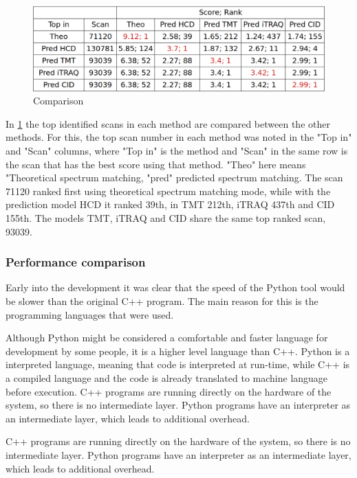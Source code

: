 \documentclass[11pt]{article}
\begin{document}
\begin{figure}[ht]
\centering
\includegraphics[width=1\textwidth]{figs/ident-comparison.png}
\caption{Comparison}
\label{fig:ident-comparison}
\end{figure}

In \cref{fig:ident-comparison} the top identified scans in each method are compared between the other methods. For this, the top scan number in each method was noted in the "Top in" and "Scan" columns, where "Top in" is the method and "Scan" in the same row is the scan that has the best score using that method. "Theo" here means "Theoretical spectrum matching, "pred" predicted spectrum matching. 
The scan 71120 ranked first using theoretical spectrum matching mode, while with the prediction model HCD it ranked 39th, in TMT 212th, iTRAQ 437th and CID 155th. The models TMT, iTRAQ and CID share the same top ranked scan, 93039.

\subsubsection{Performance comparison}
Early into the development it was clear that the speed of the Python tool would be slower than the original C++ program. The main reason for this is the programming languages that were used. 

Although Python might be considered a comfortable and faster language for development by some people, it is a higher level language than C++. Python is a interpreted language, meaning that code is interpreted at run-time, while C++ is a compiled language and the code is already translated to machine language before execution. C++ programs are running directly on the hardware of the system, so there is no intermediate layer. Python programs have an interpreter as an intermediate layer, which leads to additional overhead.

C++ programs are running directly on the hardware of the system, so there is no intermediate layer. Python programs have an interpreter as an intermediate layer, which leads to additional overhead.
\end{document}
